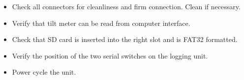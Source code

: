 \documentclass[11pt]{article} %
\begin{document}
\begin{itemize}
\item Check all connectors for cleanliness and firm connection. Clean if necessary.
\item Verify that tilt meter can be read from computer interface.
\item Check that SD card is inserted into the right slot and is FAT32 formatted.
\item Verify the position of the two serial switches on the logging unit.
\item Power cycle the unit.
\end{itemize}
\end{document}
